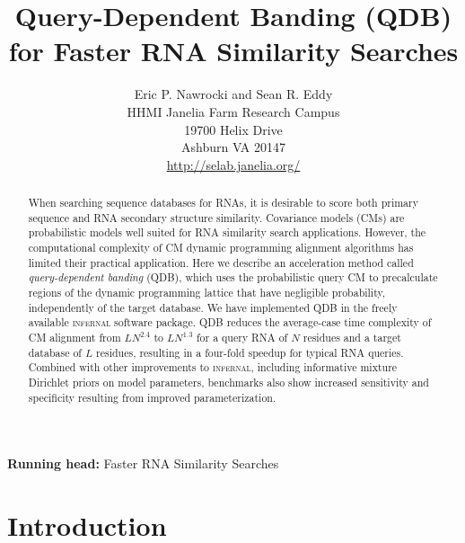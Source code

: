\documentclass[11pt]{article}
\begin{document}
\title{Query-Dependent Banding (QDB) for Faster RNA Similarity Searches}
\author{Eric P. Nawrocki and Sean R. Eddy\\
HHMI Janelia Farm Research Campus\\
19700 Helix Drive\\
Ashburn VA 20147\\
\url{http://selab.janelia.org/}\\
}
\maketitle

\begin{center}
\textbf{Running head:} Faster RNA Similarity Searches
\end{center}




\begin{abstract}

When searching sequence databases for RNAs, it is desirable to score
both primary sequence and RNA secondary structure similarity.
Covariance models (CMs) are probabilistic models well suited for RNA
similarity search applications. However, the computational complexity
of CM dynamic programming alignment algorithms has limited their
practical application. Here we describe an acceleration method called
\emph{query-dependent banding} (QDB), which uses the probabilistic
query CM to precalculate regions of the dynamic programming lattice
that have negligible probability, independently of the target
database. We have implemented QDB in the freely available
\textsc{infernal} software package. QDB reduces the average-case time
complexity of CM alignment from $LN^{2.4}$ to $LN^{1.3}$ for a query
RNA of $N$ residues and a target database of $L$ residues, resulting
in a four-fold speedup for typical RNA queries. Combined with other
improvements to \textsc{infernal}, including informative mixture
Dirichlet priors on model parameters, benchmarks also show increased
sensitivity and specificity resulting from improved parameterization.

\end{abstract}



\section{Introduction}
\end{document}

